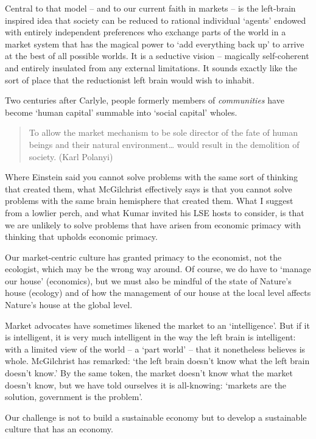 \documentclass[
]{book}
\begin{document}
Central to that model -- and to our current faith in markets -- is the left-brain inspired idea that society can be reduced to rational individual `agents' endowed with entirely independent preferences who exchange parts of the world in a market system that has the magical power to `add everything back up' to arrive at the best of all possible worlds. It is a seductive vision -- magically self-coherent and entirely insulated from any external limitations. It sounds exactly like the sort of place that the reductionist left brain would wish to inhabit.

Two centuries after Carlyle, people formerly members of \emph{communities} have become `human capital' summable into `social capital' wholes.

\begin{quote}
To allow the market mechanism to be sole director of the fate of human beings and their natural environment\ldots{} would result in the demolition of society. (Karl Polanyi)
\end{quote}

Where Einstein said you cannot solve problems with the same sort of thinking that created them, what McGilchrist effectively says is that you cannot solve problems with the same brain hemisphere that created them. What I suggest from a lowlier perch, and what Kumar invited his LSE hosts to consider, is that we are unlikely to solve problems that have arisen from economic primacy with thinking that upholds economic primacy.

Our market-centric culture has granted primacy to the economist, not the ecologist, which may be the wrong way around. Of course, we do have to `manage our house' (economics), but we must also be mindful of the state of Nature's house (ecology) and of how the management of our house at the local level affects Nature's house at the global level.

Market advocates have sometimes likened the market to an `intelligence'. But if it is intelligent, it is very much intelligent in the way the left brain is intelligent: with a limited view of the world -- a `part world' -- that it nonetheless believes is whole. McGilchrist has remarked: `the left brain doesn't know what the left brain doesn't know.' By the same token, the market doesn't know what the market doesn't know, but we have told ourselves it is all-knowing: `markets are the solution, government is the problem'.

Our challenge is not to build a sustainable economy but to develop a sustainable culture that has an economy.
\end{document}
